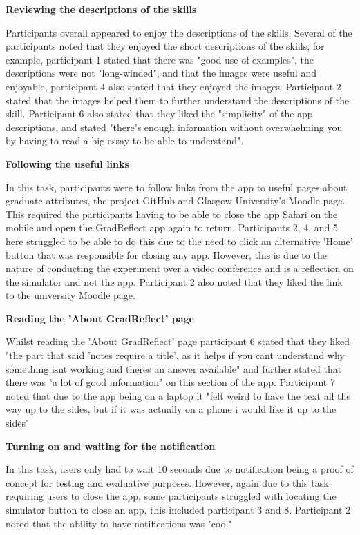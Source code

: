 \documentclass{l4proj}
\begin{document}
\textbf{Reviewing the descriptions of the skills}

Participants overall appeared to enjoy the descriptions of the skills. Several of the participants noted that they enjoyed the short descriptions of the skills, for example, participant 1 stated that there was "good use of examples", the descriptions were not "long-winded", and that the images were useful and enjoyable, participant 4 also stated that they enjoyed the images. Participant 2 stated that the images helped them to further understand the descriptions of the skill. Participant 6 also stated that they liked the "simplicity" of the app descriptions, and stated "there's enough information without overwhelming you by having to read a big essay to be able to understand".

\textbf{Following the useful links}

In this task, participants were to follow links from the app to useful pages about graduate attributes, the project GitHub and Glasgow University's Moodle page. This required the participants having to be able to close the app Safari on the mobile and open the GradReflect app again to return. Participants 2, 4, and 5 here struggled to be able to do this due to the need to click an alternative 'Home' button that was responsible for closing any app. However, this is due to the nature of conducting the experiment over a video conference and is a reflection on the simulator and not the app. Participant 2 also noted that they liked the link to the university Moodle page.

\textbf{Reading the 'About GradReflect' page}

Whilst reading the 'About GradReflect' page participant 6 stated that they liked "the part that said 'notes require a title', as it helps if you cant understand why something isnt working and theres an answer available" and further stated that there was "a lot of good information" on this section of the app. Participant 7 noted that due to the app being on a laptop it "felt weird to have the text all the way up to the sides, but if it was actually on a phone i would like it up to the sides"

\textbf{Turning on and waiting for the notification}

In this task, users only had to wait 10 seconds due to notification being a proof of concept for testing and evaluative purposes. However, again due to this task requiring users to close the app, some participants struggled with locating the simulator button to close an app, this included participant 3 and 8. Participant 2 noted that the ability to have notifications was "cool"
\end{document}
